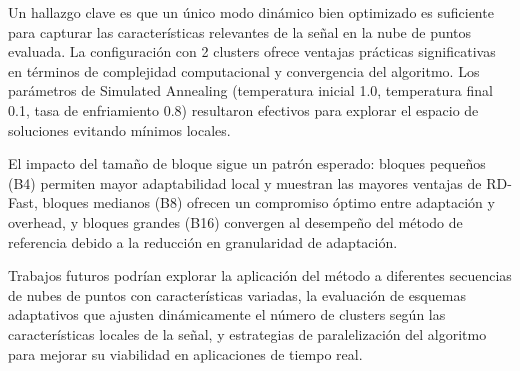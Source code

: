 Un hallazgo clave es que un único modo dinámico bien optimizado es suficiente para capturar las características relevantes de la señal en la nube de puntos evaluada. La configuración con 2 clusters ofrece ventajas prácticas significativas en términos de complejidad computacional y convergencia del algoritmo. Los parámetros de Simulated Annealing (temperatura inicial 1.0, temperatura final 0.1, tasa de enfriamiento 0.8) resultaron efectivos para explorar el espacio de soluciones evitando mínimos locales.

El impacto del tamaño de bloque sigue un patrón esperado: bloques pequeños (B4) permiten mayor adaptabilidad local y muestran las mayores ventajas de RD-Fast, bloques medianos (B8) ofrecen un compromiso óptimo entre adaptación y overhead, y bloques grandes (B16) convergen al desempeño del método de referencia debido a la reducción en granularidad de adaptación.

Trabajos futuros podrían explorar la aplicación del método a diferentes secuencias de nubes de puntos con características variadas, la evaluación de esquemas adaptativos que ajusten dinámicamente el número de clusters según las características locales de la señal, y estrategias de paralelización del algoritmo para mejorar su viabilidad en aplicaciones de tiempo real.



